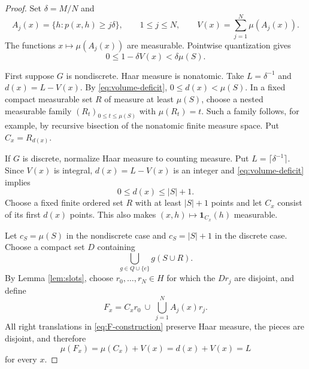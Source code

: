 \documentclass[11pt]{article}
\newcommand{\1}{\mathbf 1}
\begin{document}
\begin{proof}
Set $\delta=M/N$ and
\[
 A_j(x)=\{h:p(x,h)\geq j\delta\},\qquad 1\leq j\leq N,
 \qquad V(x)=\sum_{j=1}^N\mu(A_j(x)).
\]
The functions $x\mapsto\mu(A_j(x))$ are measurable.  Pointwise quantization
gives
\begin{equation}\label{eq:volume-deficit}
 0\leq 1-\delta V(x)<\delta\mu(S).
\end{equation}

First suppose $G$ is nondiscrete.  Haar measure is nonatomic.  Take
$L=\delta^{-1}$ and $d(x)=L-V(x)$.  By \eqref{eq:volume-deficit},
$0\leq d(x)<\mu(S)$.  In a fixed compact measurable set $R$ of measure at
least $\mu(S)$, choose a nested measurable family $(R_t)_{0\leq t\leq\mu(S)}$
with $\mu(R_t)=t$.  Such a family follows, for example, by recursive bisection
of the nonatomic finite measure space.  Put $C_x=R_{d(x)}$.

If $G$ is discrete, normalize Haar measure to counting measure.  Put
$L=\lceil\delta^{-1}\rceil$.  Since $V(x)$ is integral,
$d(x)=L-V(x)$ is an integer and \eqref{eq:volume-deficit} implies
\[
 0\leq d(x)\leq |S|+1.
\]
Choose a fixed finite ordered set $R$ with at least $|S|+1$ points and let
$C_x$ consist of its first $d(x)$ points.  This also makes $(x,h)\mapsto
\1_{C_x}(h)$ measurable.

Let $c_S=\mu(S)$ in the nondiscrete case and $c_S=|S|+1$ in the discrete
case.  Choose a compact set $D$ containing
\[
 \bigcup_{g\in Q\cup\{e\}}g(S\cup R).
\]
By Lemma \ref{lem:slots}, choose $r_0,\ldots,r_N\in H$ for which the
$Dr_j$ are disjoint, and define
\begin{equation}\label{eq:F-construction}
 F_x= C_xr_0\ \cup\ \bigcup_{j=1}^N A_j(x)r_j.
\end{equation}
All right translations in \eqref{eq:F-construction} preserve Haar measure,
the pieces are disjoint, and therefore
\[
 \mu(F_x)=\mu(C_x)+V(x)=d(x)+V(x)=L
\]
for every $x$.


\end{proof}
\end{document}
